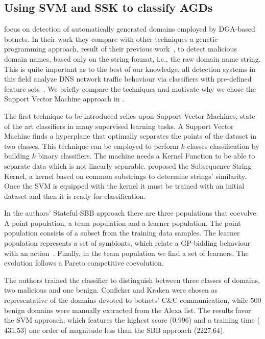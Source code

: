 \subsection{Using SVM and SSK to classify AGDs} %
\label{sub:analyzing_string_format_based_classifiers_for_botnet_detection_gp_and_svm}
\citet*{haddadi2013} focus on detection of automatically generated domains employed
by DGA-based botnets. In their work they compare with other techniques a genetic
programming approach, result of their previous work~\cite{haddadi2013malicious}, to detect
malicious domain names, based only on the string format, i.e., the raw domain name
string. This is quite important as to the best of our knowledge, all detection
systems in this field analyze DNS network traffic behaviour via classifiers with
pre-defined feature sets~\cite{haddadi2013}.
We briefly compare the techniques and motivate why we chose the Support Vector Machine
approach in \thesystem.

The first technique to be introduced relies upon Support Vector Machines,
state of the art classifiers in many supervised learning tasks. A Support Vector
Machine finds a hyperplane that optimally separates the points of the dataset in two
classes. This technique can be employed to perform $k$-classes classification by
building $k$ binary classifiers. The machine needs a Kernel Function to be able
to separate data which is not-linearly separable. \citet{lodhi2002} proposed the
Subsequence String Kernel, a kernel based on common substrings to determine strings'
similarity. Once the SVM is equipped with the kernel it must be trained with an initial
dataset and then it is ready for classification.

In the authors' Stateful-SBB approach there are
three populations that coevolve: A point population, a team population and a learner
population. The point population consists of a subset from the training data samples.
The learner population represents a set of symbionts, which relate a GP-bidding
behaviour with an action~\cite{haddadi2013}. Finally, in the team population we find
a set of learners. The evolution follows a Pareto competitive coevolution.

The authors trained the classifier to distinguish between three
classes of domains, two malicious and one benign. Conficker and Kraken were chosen as
representative of the domains devoted to botnets' C\&C communication, while 500 benign
domains were manually extracted from the Alexa list. The results favor the SVM
approach, which features the highest score ($0.996$) and a training time ($431.53$) one order of magnitude less than the SBB approach ($2227.64$).

